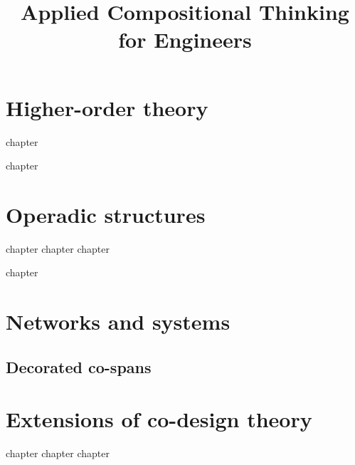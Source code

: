\title{Applied Compositional Thinking\\ for Engineers}
\date{}
\frontmatter

\tableofcontents
\mainmatter
\addtocounter{part}{8}
\addtocounter{chapter}{38}


\part{Higher-order theory}\label{part:higher-order}




{chapter}

{chapter}


\part{Operadic structures}\label{part:operads}


{chapter}
{chapter}
{chapter}

{chapter}


\part{Networks and systems}\label{part:networks}

\chapter{Decorated co-spans}


\part{Extensions of co-design theory}
{chapter}
{chapter}
{chapter}

\backmatter

\printbibliography
%
%

\printindex

%
%
%
%
%
%
